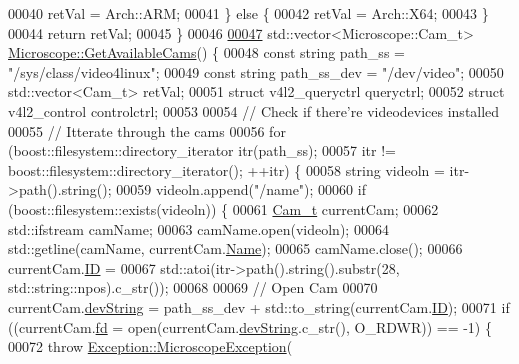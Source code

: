 \begin{DoxyCode}
00040     retVal = Arch::ARM;
00041   \} \textcolor{keywordflow}{else} \{
00042     retVal = Arch::X64;
00043   \}
00044   \textcolor{keywordflow}{return} retVal;
00045 \}
00046 
\hypertarget{_microscope_8cpp_source_l00047}{}\hyperlink{class_hardware_1_1_microscope_a71a409aae67baf63fd27678eda462e38}{00047} std::vector<Microscope::Cam\_t> \hyperlink{class_hardware_1_1_microscope_a71a409aae67baf63fd27678eda462e38}{Microscope::GetAvailableCams}() \{
00048   \textcolor{keyword}{const} \textcolor{keywordtype}{string} path\_ss = \textcolor{stringliteral}{"/sys/class/video4linux"};
00049   \textcolor{keyword}{const} \textcolor{keywordtype}{string} path\_ss\_dev = \textcolor{stringliteral}{"/dev/video"};
00050   std::vector<Cam\_t> retVal;
00051   \textcolor{keyword}{struct }v4l2\_queryctrl queryctrl;
00052   \textcolor{keyword}{struct }v4l2\_control controlctrl;
00053 
00054   \textcolor{comment}{// Check if there're videodevices installed}
00055   \textcolor{comment}{// Itterate through the cams}
00056   \textcolor{keywordflow}{for} (boost::filesystem::directory\_iterator itr(path\_ss);
00057        itr != boost::filesystem::directory\_iterator(); ++itr) \{
00058     \textcolor{keywordtype}{string} videoln = itr->path().string();
00059     videoln.append(\textcolor{stringliteral}{"/name"});
00060     \textcolor{keywordflow}{if} (boost::filesystem::exists(videoln)) \{
00061       \hyperlink{struct_hardware_1_1_microscope_1_1_cam__t}{Cam\_t} currentCam;
00062       std::ifstream camName;
00063       camName.open(videoln);
00064       std::getline(camName, currentCam.\hyperlink{struct_hardware_1_1_microscope_1_1_cam__t_abadd87f124923661f2e94d78cee3dbf4}{Name});
00065       camName.close();
00066       currentCam.\hyperlink{struct_hardware_1_1_microscope_1_1_cam__t_a870c5b29e3b987dce2a82308165cd178}{ID} =
00067           std::atoi(itr->path().string().substr(28, std::string::npos).c\_str());
00068 
00069       \textcolor{comment}{// Open Cam}
00070       currentCam.\hyperlink{struct_hardware_1_1_microscope_1_1_cam__t_ab179002870eff0055f9f61b0bae276aa}{devString} = path\_ss\_dev + std::to\_string(currentCam.\hyperlink{struct_hardware_1_1_microscope_1_1_cam__t_a870c5b29e3b987dce2a82308165cd178}{ID});
00071       \textcolor{keywordflow}{if} ((currentCam.\hyperlink{struct_hardware_1_1_microscope_1_1_cam__t_ab8d692f05f97f5f3cc0401f750d9ad2e}{fd} = open(currentCam.\hyperlink{struct_hardware_1_1_microscope_1_1_cam__t_ab179002870eff0055f9f61b0bae276aa}{devString}.c\_str(), O\_RDWR)) == -1) \{
00072         \textcolor{keywordflow}{throw} \hyperlink{class_hardware_1_1_exception_1_1_microscope_exception}{Exception::MicroscopeException}(

\end{DoxyCode}
